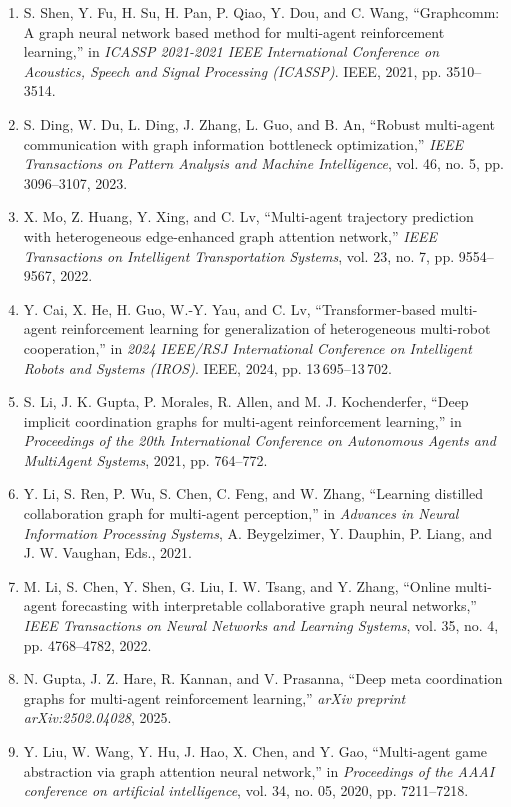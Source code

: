 \documentclass[10pt,UTF8,fontset=fandol]{ctexart}
\begin{document}
\begin{enumerate}[leftmargin=2.4em,labelsep=0.4em,itemsep=0.15em]
\item S. Shen, Y. Fu, H. Su, H. Pan, P. Qiao, Y. Dou, and C. Wang, ``Graphcomm: A graph neural network based method for multi-agent reinforcement learning,'' in \textit{ICASSP 2021-2021 IEEE International Conference on Acoustics, Speech and Signal Processing (ICASSP)}. IEEE, 2021, pp. 3510--3514.
\item S. Ding, W. Du, L. Ding, J. Zhang, L. Guo, and B. An, ``Robust multi-agent communication with graph information bottleneck optimization,'' \textit{IEEE Transactions on Pattern Analysis and Machine Intelligence}, vol. 46, no. 5, pp. 3096--3107, 2023.
\item X. Mo, Z. Huang, Y. Xing, and C. Lv, ``Multi-agent trajectory prediction with heterogeneous edge-enhanced graph attention network,'' \textit{IEEE Transactions on Intelligent Transportation Systems}, vol. 23, no. 7, pp. 9554--9567, 2022.
\item Y. Cai, X. He, H. Guo, W.-Y. Yau, and C. Lv, ``Transformer-based multi-agent reinforcement learning for generalization of heterogeneous multi-robot cooperation,'' in \textit{2024 IEEE/RSJ International Conference on Intelligent Robots and Systems (IROS)}. IEEE, 2024, pp. 13\,695--13\,702.
\item S. Li, J. K. Gupta, P. Morales, R. Allen, and M. J. Kochenderfer, ``Deep implicit coordination graphs for multi-agent reinforcement learning,'' in \textit{Proceedings of the 20th International Conference on Autonomous Agents and MultiAgent Systems}, 2021, pp. 764--772.
\item Y. Li, S. Ren, P. Wu, S. Chen, C. Feng, and W. Zhang, ``Learning distilled collaboration graph for multi-agent perception,'' in \textit{Advances in Neural Information Processing Systems}, A. Beygelzimer, Y. Dauphin, P. Liang, and J. W. Vaughan, Eds., 2021.
\item M. Li, S. Chen, Y. Shen, G. Liu, I. W. Tsang, and Y. Zhang, ``Online multi-agent forecasting with interpretable collaborative graph neural networks,'' \textit{IEEE Transactions on Neural Networks and Learning Systems}, vol. 35, no. 4, pp. 4768--4782, 2022.
\item N. Gupta, J. Z. Hare, R. Kannan, and V. Prasanna, ``Deep meta coordination graphs for multi-agent reinforcement learning,'' \textit{arXiv preprint arXiv:2502.04028}, 2025.
\item Y. Liu, W. Wang, Y. Hu, J. Hao, X. Chen, and Y. Gao, ``Multi-agent game abstraction via graph attention neural network,'' in \textit{Proceedings of the AAAI conference on artificial intelligence}, vol. 34, no. 05, 2020, pp. 7211--7218.

\end{enumerate}
\end{document}

